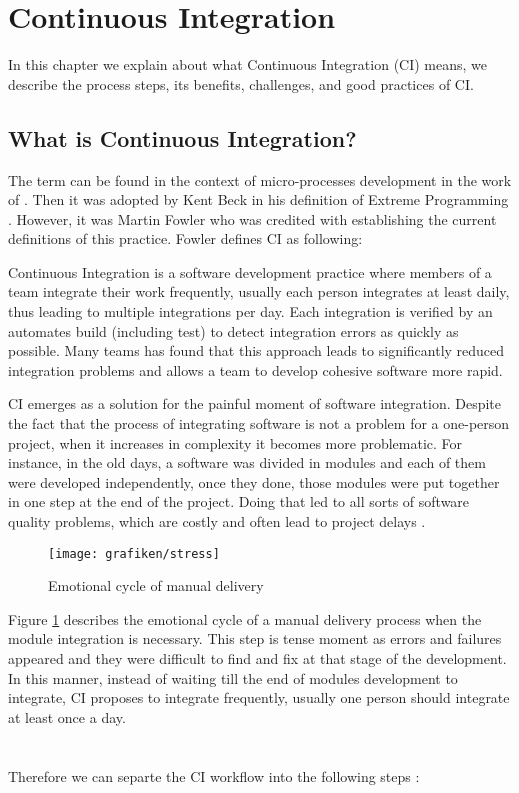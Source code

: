 \section{Continuous Integration}
\label{chap:ci}
In this chapter we explain about what Continuous Integration (CI) means, we describe the process steps, its benefits, challenges, and good practices of CI.

\subsection{What is Continuous Integration?}
\label{sec:ci-def}
The term can be found in the context of micro-processes development in the work of \citeauthor{Booch2007}. Then it was adopted by Kent Beck in his definition of Extreme Programming \cite{Beck1999}. However, it was Martin Fowler who was credited with establishing the current definitions of this practice. Fowler defines CI as following:

Continuous Integration is a software development practice where members of a team integrate their work frequently, usually each person integrates at least daily, thus leading to multiple integrations per day. Each integration is verified by an automates build (including test) to detect integration errors as quickly as possible. Many teams has found that this approach leads to significantly reduced integration problems and allows a team to develop cohesive software more rapid\cite{Fowler2006}.

CI emerges as a solution for the painful moment of software integration. Despite the fact that the process of integrating software is not a problem for a one-person project, when it increases in complexity it becomes more problematic. For instance, in the old days, a software was divided in modules and each of them were developed independently, once they done, those modules were put together in one step at the end of the project. Doing that led to all sorts of software quality problems, which are costly and often lead to project delays \cite{Duvall2007}.

\begin{figure}[ht]
	\centering
    \texttt{[image: grafiken/stress]}
    \caption{Emotional cycle of manual delivery \cite{Goff2015}}
    \label{fig:emotional}
\end{figure}

Figure \ref{fig:emotional} describes the emotional cycle of a manual delivery process\cite{Goff2015} when the module integration is necessary. This step is tense moment as errors and failures appeared and they were difficult to find and fix at that stage of the development. In this manner, instead of waiting till the end of modules development to integrate, CI proposes to integrate frequently, usually one person should integrate at least once a day.
\\
\\
\\
Therefore we can separte the CI workflow into the following steps \cite{Fowler2006}:

